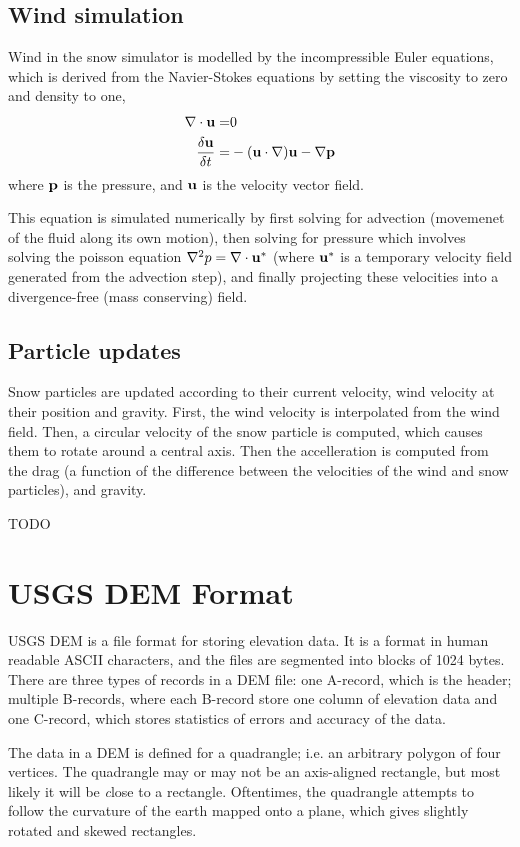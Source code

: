 \subsection{Wind simulation}
Wind in the snow simulator is modelled by the incompressible Euler equations, which is derived from the Navier-Stokes equations by setting the viscosity to zero and density to one,
\begin{align}
\nabla \cdot {\mathbf u} = & 0\\
\frac{\delta{\mathbf u}}{\delta t} = & -({\mathbf u}\cdot \nabla){\mathbf u} - \nabla{\mathbf p}
\end{align}
where ${\mathbf p}$ is the pressure, and ${\mathbf u}$ is the velocity vector field.

This equation is simulated numerically by first solving for advection (movemenet of the fluid along its own motion), then solving for pressure which involves solving the poisson equation $\nabla^2 p = \nabla\cdot {\mathbf u}^*$ (where ${\mathbf u}^*$ is a temporary velocity field generated from the advection step), and finally projecting these velocities into a divergence-free (mass conserving) field\cite{snowsim1}.

\subsection{Particle updates}
Snow particles are updated according to their current velocity, wind velocity at their position and gravity.\cite{snowsim1} First, the wind velocity is interpolated from the wind field. Then, a circular velocity of the snow particle is computed, which causes them to rotate around a central axis. Then the accelleration is computed from the drag (a function of the difference between the velocities of the wind and snow particles), and gravity. 

TODO 

\section{USGS DEM Format}
USGS DEM is a file format for storing elevation data. It is a format in human readable ASCII characters, and the files are segmented into blocks of 1024 bytes. There are three types of records in a DEM file: one A-record, which is the header; multiple B-records, where each B-record store one column of elevation data and one C-record, which stores statistics of errors and accuracy of the data.\cite{usgsdem}

The data in a DEM is defined for a quadrangle; i.e. an arbitrary polygon of four vertices. The quadrangle may or may not be an axis-aligned rectangle, but most likely it will be {\textit close} to a rectangle. Oftentimes, the quadrangle attempts to follow the curvature of the earth mapped onto a plane, which gives slightly rotated and skewed rectangles.

